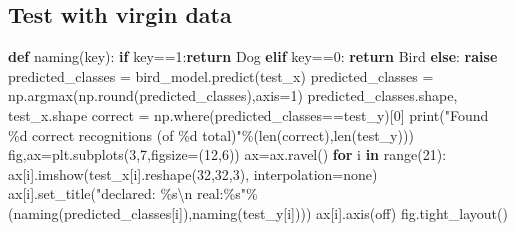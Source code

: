 \documentclass[
  letterpaper,
  DIV=11,
  numbers=noendperiod]{scrartcl}
\newenvironment{Shaded}{\begin{snugshade}}{\end{snugshade}}
\newcommand{\BuiltInTok}[1]{\textcolor[rgb]{0.00,0.23,0.31}{#1}}
\newcommand{\CharTok}[1]{\textcolor[rgb]{0.13,0.47,0.30}{#1}}
\newcommand{\ControlFlowTok}[1]{\textcolor[rgb]{0.00,0.23,0.31}{\textbf{#1}}}
\newcommand{\DecValTok}[1]{\textcolor[rgb]{0.68,0.00,0.00}{#1}}
\newcommand{\KeywordTok}[1]{\textcolor[rgb]{0.00,0.23,0.31}{\textbf{#1}}}
\newcommand{\NormalTok}[1]{\textcolor[rgb]{0.00,0.23,0.31}{#1}}
\newcommand{\OperatorTok}[1]{\textcolor[rgb]{0.37,0.37,0.37}{#1}}
\newcommand{\SpecialCharTok}[1]{\textcolor[rgb]{0.37,0.37,0.37}{#1}}
\newcommand{\StringTok}[1]{\textcolor[rgb]{0.13,0.47,0.30}{#1}}
\begin{document}
\subsection{Test with virgin data}\label{test-with-virgin-data}

\begin{Shaded}
\begin{Highlighting}[]
\KeywordTok{def}\NormalTok{ naming(key):}
    \ControlFlowTok{if}\NormalTok{ key}\OperatorTok{==}\DecValTok{1}\NormalTok{:}\ControlFlowTok{return} \StringTok{\textquotesingle{}Dog\textquotesingle{}}
    \ControlFlowTok{elif}\NormalTok{ key}\OperatorTok{==}\DecValTok{0}\NormalTok{: }\ControlFlowTok{return} \StringTok{\textquotesingle{}Bird\textquotesingle{}}
    \ControlFlowTok{else}\NormalTok{: }\ControlFlowTok{raise}
\NormalTok{predicted\_classes }\OperatorTok{=}\NormalTok{ bird\_model.predict(test\_x)}
\NormalTok{predicted\_classes }\OperatorTok{=}\NormalTok{ np.argmax(np.}\BuiltInTok{round}\NormalTok{(predicted\_classes),axis}\OperatorTok{=}\DecValTok{1}\NormalTok{)}
\NormalTok{predicted\_classes.shape, test\_x.shape}
\NormalTok{correct }\OperatorTok{=}\NormalTok{ np.where(predicted\_classes}\OperatorTok{==}\NormalTok{test\_y)[}\DecValTok{0}\NormalTok{]}
\BuiltInTok{print}\NormalTok{(}\StringTok{"Found }\SpecialCharTok{\%d}\StringTok{ correct recognitions (of }\SpecialCharTok{\%d}\StringTok{ total)"}\OperatorTok{\%}\NormalTok{(}\BuiltInTok{len}\NormalTok{(correct),}\BuiltInTok{len}\NormalTok{(test\_y)))}
\NormalTok{fig,ax}\OperatorTok{=}\NormalTok{plt.subplots(}\DecValTok{3}\NormalTok{,}\DecValTok{7}\NormalTok{,figsize}\OperatorTok{=}\NormalTok{(}\DecValTok{12}\NormalTok{,}\DecValTok{6}\NormalTok{))}
\NormalTok{ax}\OperatorTok{=}\NormalTok{ax.ravel()}
\ControlFlowTok{for}\NormalTok{ i }\KeywordTok{in} \BuiltInTok{range}\NormalTok{(}\DecValTok{21}\NormalTok{):}
\NormalTok{    ax[i].imshow(test\_x[i].reshape(}\DecValTok{32}\NormalTok{,}\DecValTok{32}\NormalTok{,}\DecValTok{3}\NormalTok{), interpolation}\OperatorTok{=}\StringTok{\textquotesingle{}none\textquotesingle{}}\NormalTok{)}
\NormalTok{    ax[i].set\_title(}\StringTok{"declared: }\SpecialCharTok{\%s}\CharTok{\textbackslash{}n}\StringTok{ real:}\SpecialCharTok{\%s}\StringTok{"}\OperatorTok{\%}\NormalTok{(naming(predicted\_classes[i]),naming(test\_y[i])))}
\NormalTok{    ax[i].axis(}\StringTok{\textquotesingle{}off\textquotesingle{}}\NormalTok{)}
\NormalTok{fig.tight\_layout()}
\end{Highlighting}
\end{Shaded}
\end{document}
